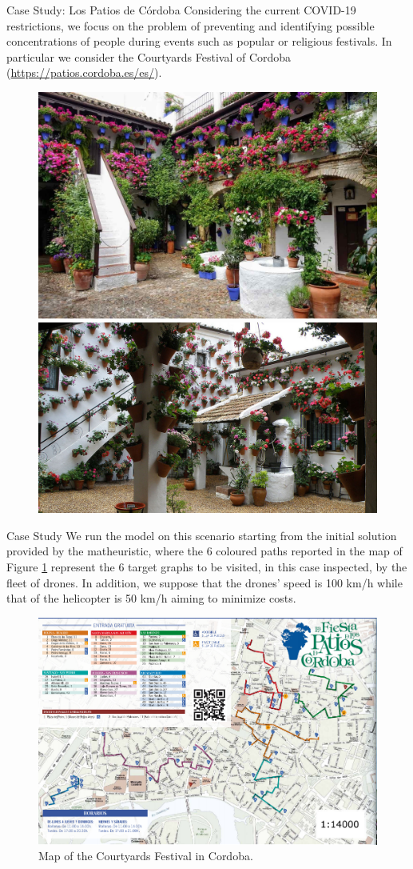 \documentclass[slidestop,usepdftitle=false,10pt]{beamer}
\begin{document}
    \begin{frame}{Case Study: Los Patios de C\'ordoba}
        Considering the current COVID-19 restrictions, we focus on the problem of preventing and identifying possible concentrations of people during events such as popular or religious festivals. In particular we consider the Courtyards Festival of Cordoba (\url{https://patios.cordoba.es/es/}).
        \begin{figure}[h!]
        \centering
        \includegraphics[width=0.33\linewidth]{patios_bonitos.jpg}
        \includegraphics[width=0.4\linewidth]{patios_bonitos2.jpg}
        \end{figure}
    \end{frame}


    \begin{frame}{Case Study}
        \small
        We run the model on this scenario starting from the initial solution provided by the matheuristic, where the 6 coloured paths reported in the map of Figure \ref{fig:mapPF} represent the 6 target graphs to be visited, in this case inspected, by the fleet of drones. In addition, we suppose that the drones' speed is 100 km/h while that of the helicopter is  50 km/h aiming to minimize costs.
        \begin{figure}[h!]
        \centering
        \includegraphics[width=0.5\linewidth]{first.png}
        \caption{Map of the Courtyards Festival in Cordoba. \label{fig:mapPF}}
        \end{figure}
    \end{frame}
\end{document}
